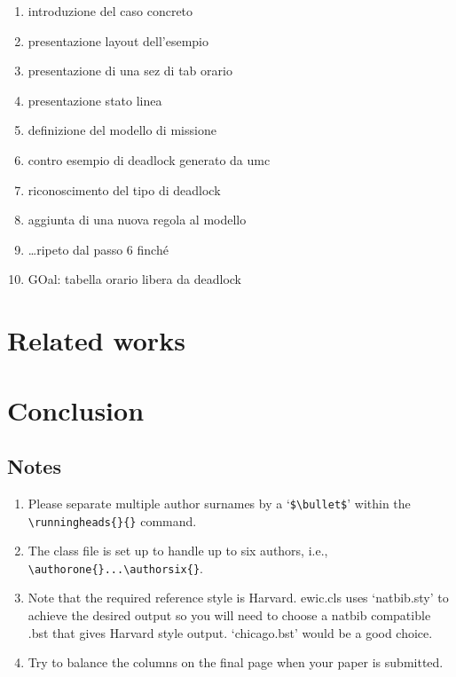\documentclass{ewic}
\begin{document}
\begin{enumerate}
\item introduzione del caso concreto
\item presentazione layout dell'esempio
\item presentazione di una sez di tab orario
\item presentazione stato linea
\item definizione del modello di missione
\item contro esempio di deadlock generato da umc
\item riconoscimento del tipo di deadlock
\item aggiunta di una nuova regola al modello
\item \ldots ripeto dal passo 6 finch\'{e}
\item GOal: tabella orario libera da deadlock
\end{enumerate}
%

\section{Related works}
%
\section{Conclusion}
%



\pagebreak
\subsection{Notes}
\begin{enumerate}
\item Please separate multiple author surnames by a `\verb+$\bullet$+' within the
\verb+\runningheads{}{}+ command.

\item The class file is set up to handle up to six authors, i.e., \verb+\authorone{}...\authorsix{}+.

\item Note that the required reference style is Harvard. ewic.cls
uses `natbib.sty' to achieve the desired output so you will need
to choose a natbib compatible .bst that gives Harvard style
output. `chicago.bst' would be a good choice.

\item Try to balance the columns on the final page when your paper is submitted.
\end{enumerate}
\end{document}
